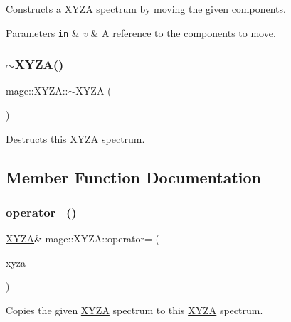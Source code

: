 Constructs a \hyperlink{structmage_1_1_x_y_z_a}{X\+Y\+ZA} spectrum by moving the given components.


\begin{DoxyParams}[1]{Parameters}
\mbox{\tt in}  & {\em v} & A reference to the components to move. \\
\hline
\end{DoxyParams}
\hypertarget{structmage_1_1_x_y_z_a_a2f706527b01ff7e86099b76180ebd25f}{}\label{structmage_1_1_x_y_z_a_a2f706527b01ff7e86099b76180ebd25f} 
\subsubsection{\texorpdfstring{$\sim$\+X\+Y\+Z\+A()}{~XYZA()}}
{\footnotesize\ttfamily mage\+::\+X\+Y\+Z\+A\+::$\sim$\+X\+Y\+ZA (\begin{DoxyParamCaption}{ }\end{DoxyParamCaption})\hspace{0.3cm}{\ttfamily [default]}}

Destructs this \hyperlink{structmage_1_1_x_y_z_a}{X\+Y\+ZA} spectrum. 

\subsection{Member Function Documentation}
\hypertarget{structmage_1_1_x_y_z_a_a14c9712450879f4c754f2a78f11c944c}{}\label{structmage_1_1_x_y_z_a_a14c9712450879f4c754f2a78f11c944c} 
\subsubsection{\texorpdfstring{operator=()}{operator=()}\hspace{0.1cm}{\footnotesize\ttfamily [1/2]}}
{\footnotesize\ttfamily \hyperlink{structmage_1_1_x_y_z_a}{X\+Y\+ZA}\& mage\+::\+X\+Y\+Z\+A\+::operator= (\begin{DoxyParamCaption}\item[{const \hyperlink{structmage_1_1_x_y_z_a}{X\+Y\+ZA} \&}]{xyza }\end{DoxyParamCaption})\hspace{0.3cm}{\ttfamily [default]}}

Copies the given \hyperlink{structmage_1_1_x_y_z_a}{X\+Y\+ZA} spectrum to this \hyperlink{structmage_1_1_x_y_z_a}{X\+Y\+ZA} spectrum.


